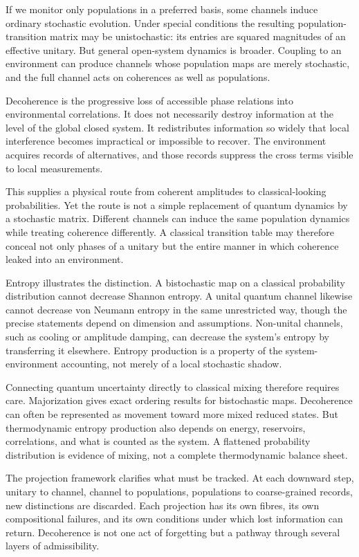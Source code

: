 \documentclass[12pt,openany]{book}
\begin{document}
If we monitor only populations in a preferred basis, some channels induce ordinary stochastic evolution. Under special conditions the resulting population-transition matrix may be unistochastic: its entries are squared magnitudes of an effective unitary. But general open-system dynamics is broader. Coupling to an environment can produce channels whose population maps are merely stochastic, and the full channel acts on coherences as well as populations.

Decoherence is the progressive loss of accessible phase relations into environmental correlations. It does not necessarily destroy information at the level of the global closed system. It redistributes information so widely that local interference becomes impractical or impossible to recover. The environment acquires records of alternatives, and those records suppress the cross terms visible to local measurements.

This supplies a physical route from coherent amplitudes to classical-looking probabilities. Yet the route is not a simple replacement of quantum dynamics by a stochastic matrix. Different channels can induce the same population dynamics while treating coherence differently. A classical transition table may therefore conceal not only phases of a unitary but the entire manner in which coherence leaked into an environment.

Entropy illustrates the distinction. A bistochastic map on a classical probability distribution cannot decrease Shannon entropy. A unital quantum channel likewise cannot decrease von Neumann entropy in the same unrestricted way, though the precise statements depend on dimension and assumptions. Non-unital channels, such as cooling or amplitude damping, can decrease the system's entropy by transferring it elsewhere. Entropy production is a property of the system-environment accounting, not merely of a local stochastic shadow.

Connecting quantum uncertainty directly to classical mixing therefore requires care. Majorization gives exact ordering results for bistochastic maps. Decoherence can often be represented as movement toward more mixed reduced states. But thermodynamic entropy production also depends on energy, reservoirs, correlations, and what is counted as the system. A flattened probability distribution is evidence of mixing, not a complete thermodynamic balance sheet.

The projection framework clarifies what must be tracked. At each downward step, unitary to channel, channel to populations, populations to coarse-grained records, new distinctions are discarded. Each projection has its own fibres, its own compositional failures, and its own conditions under which lost information can return. Decoherence is not one act of forgetting but a pathway through several layers of admissibility.
\end{document}
